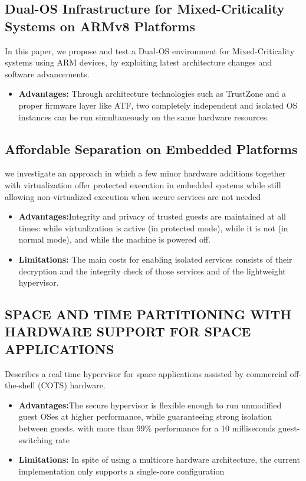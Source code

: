 \documentclass[conference]{IEEEtran}
\begin{document}
\subsection{Dual-OS Infrastructure for Mixed-Criticality Systems on ARMv8 Platforms}
In this paper, we propose and test a Dual-OS environment for Mixed-Criticality systems using ARM devices, by exploiting latest architecture changes and software advancements.
\begin{itemize}
    \item \textbf{Advantages:} Through architecture technologies such as TrustZone and a proper firmware layer like ATF, two completely independent and isolated OS instances can be run simultaneously on the same hardware resources.
\end{itemize}


\subsection{Affordable Separation on Embedded Platforms}
we investigate an approach in which a few minor hardware additions together with virtualization offer protected execution in embedded systems while still allowing non-virtualized execution when secure services are not needed
\begin{itemize}
    \item \textbf{Advantages:}Integrity and privacy of trusted guests are maintained at all times: while virtualization is active (in protected mode), while it is not (in normal mode), and while the machine is powered off.
    \item \textbf{Limitations:} The main costs for enabling isolated services consists of their decryption and the integrity check of those services and of the lightweight hypervisor.
\end{itemize}


\subsection{SPACE AND TIME PARTITIONING WITH HARDWARE SUPPORT FOR SPACE APPLICATIONS}
Describes a real time hypervisor for space applications assisted by commercial off-the-shell (COTS) hardware.
\begin{itemize}
    \item \textbf{Advantages:}The secure hypervisor is flexible enough to run unmodified guest OSes at higher performance, while guaranteeing strong isolation between guests, with more than $99\%$ performance for a 10 milliseconds guest-switching rate
    \item \textbf{Limitations:} In spite of using a multicore hardware architecture, the current implementation only supports a single-core configuration
\end{itemize}
\end{document}
